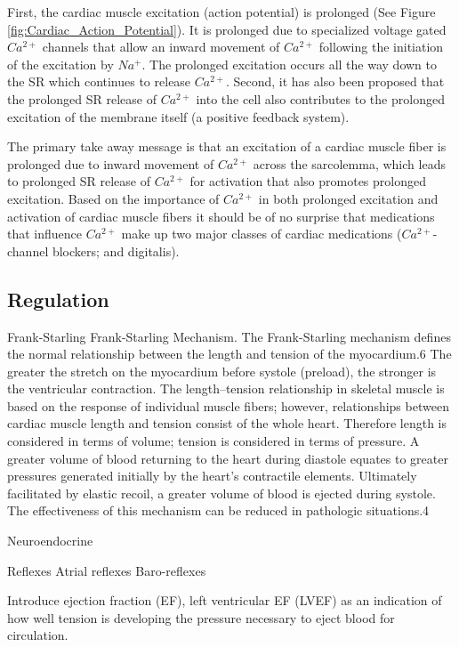 First, the cardiac muscle excitation (action potential) is prolonged (See Figure \ref{fig:Cardiac_Action_Potential}). It is prolonged due to specialized voltage gated $Ca^{2+}$ channels that allow an inward movement of $Ca^{2+}$ following the initiation of the excitation by $Na^+$. The prolonged excitation occurs all the way down to the SR which continues to release $Ca^{2+}$. Second, it has also been proposed that the prolonged SR release of $Ca^{2+}$ into the cell also contributes to the prolonged excitation of the membrane itself (a positive feedback system). 

The primary take away message is that an excitation of a cardiac muscle fiber is prolonged due to inward movement of $Ca^{2+}$ across the sarcolemma, which leads to prolonged SR release of $Ca^{2+}$ for activation that also promotes prolonged excitation. Based on the importance of $Ca^{2+}$ in both prolonged excitation and activation of cardiac muscle fibers it should be of no surprise that medications that influence $Ca^{2+}$ make up two major classes of cardiac medications ($Ca^{2+}$-channel blockers; and digitalis).


\subsection{Regulation}

Frank-Starling
Frank-Starling Mechanism.
The Frank-Starling mechanism defines the normal relationship between the length and tension of the myocardium.6 The greater the stretch on the myocardium before systole (preload), the stronger is the ventricular contraction. The length–tension relationship in skeletal muscle is based on the response of individual muscle fibers; however, relationships between cardiac muscle length and tension consist of the whole heart. Therefore length is considered in terms of volume; tension is considered in terms of pressure. A greater volume of blood returning to the heart during diastole equates to greater pressures generated initially by the heart’s contractile elements. Ultimately facilitated by elastic recoil, a greater volume of blood is ejected during systole. The effectiveness of this mechanism can be reduced in pathologic situations.4

Neuroendocrine

Reflexes
Atrial reflexes
Baro-reflexes


Introduce ejection fraction (EF), left ventricular EF (LVEF) as an indication of how well tension is developing the pressure necessary to eject blood for circulation.

